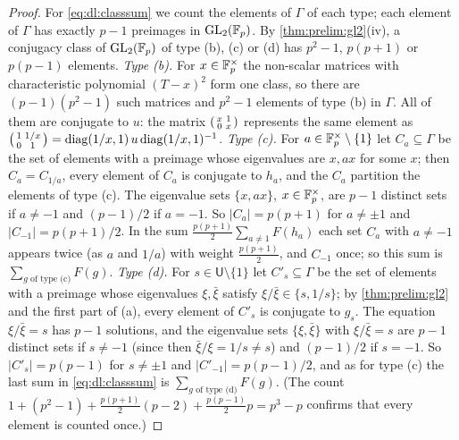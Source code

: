 \begin{proof}
For \eqref{eq:dl:classsum} we count the elements of $\Gamma$ of each type; each
element of $\Gamma$ has exactly $p-1$ preimages in $\mathrm{GL}_2(\mathbb F_p)$. By
\cref{thm:prelim:gl2}(iv), a conjugacy class of $\mathrm{GL}_2(\mathbb F_p)$ of type
(b), (c) or (d) has $p^2-1$, $p(p+1)$ or $p(p-1)$ elements.
\emph{Type (b).} For $x\in\mathbb F_p^\times$ the non-scalar matrices with
characteristic polynomial $(T-x)^2$ form one class, so there are
$(p-1)(p^2-1)$ such matrices and $p^2-1$ elements of type (b) in $\Gamma$. All
of them are conjugate to $u$: the matrix
$\begin{psmallmatrix}x&1\\0&x\end{psmallmatrix}$ represents the same element as
$\begin{psmallmatrix}1&1/x\\0&1\end{psmallmatrix}
=\mathrm{diag}(1/x,1)\,u\,\mathrm{diag}(1/x,1)^{-1}$.
\emph{Type (c).} For $a\in\mathbb F_p^\times\setminus\{1\}$ let $C_a\subseteq\Gamma$ be
the set of elements with a preimage whose eigenvalues are $x,ax$ for some $x$;
then $C_a=C_{1/a}$, every element of $C_a$ is conjugate to $h_a$, and the $C_a$
partition the elements of type (c). The eigenvalue sets $\{x,ax\}$,
$x\in\mathbb F_p^\times$, are $p-1$ distinct sets if $a\ne-1$ and $(p-1)/2$ if $a=-1$.
So $|C_a|=p(p+1)$ for $a\ne\pm1$ and $|C_{-1}|=p(p+1)/2$. In the sum
$\frac{p(p+1)}2\sum_{a\ne1}F(h_a)$ each set $C_a$ with $a\ne-1$ appears twice
(as $a$ and $1/a$) with weight $\frac{p(p+1)}2$, and $C_{-1}$ once; so this sum
is $\sum_{g\text{ of type (c)}}F(g)$.
\emph{Type (d).} For $s\in\mathsf U\setminus\{1\}$ let $C'_s\subseteq\Gamma$ be
the set of elements with a preimage whose eigenvalues $\xi,\bar\xi$ satisfy
$\xi/\bar\xi\in\{s,1/s\}$; by \cref{thm:prelim:gl2} and the first part of
(a), every element of $C'_s$ is conjugate to $g_s$. The equation
$\xi/\bar\xi=s$ has $p-1$ solutions, and the eigenvalue sets $\{\xi,\bar\xi\}$
with $\xi/\bar\xi=s$ are $p-1$ distinct sets if $s\ne-1$ (since then
$\bar\xi/\xi=1/s\ne s$) and $(p-1)/2$ if $s=-1$. So $|C'_s|=p(p-1)$ for
$s\ne\pm1$ and $|C'_{-1}|=p(p-1)/2$, and as for type (c) the last sum in
\eqref{eq:dl:classsum} is $\sum_{g\text{ of type (d)}}F(g)$. (The count
$1+(p^2-1)+\frac{p(p+1)}2(p-2)+\frac{p(p-1)}2p=p^3-p$ confirms that every
element is counted once.)


\end{proof}
